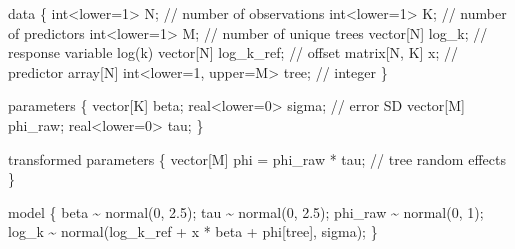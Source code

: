 \documentclass[
  12pt,
  letterpaper,
  DIV=11,
  numbers=noendperiod]{scrartcl}
\newenvironment{Shaded}{\begin{snugshade}}{\end{snugshade}}
\newcommand{\CommentTok}[1]{\textcolor[rgb]{0.37,0.37,0.37}{#1}}
\newcommand{\DataTypeTok}[1]{\textcolor[rgb]{0.68,0.00,0.00}{#1}}
\newcommand{\DecValTok}[1]{\textcolor[rgb]{0.68,0.00,0.00}{#1}}
\newcommand{\FloatTok}[1]{\textcolor[rgb]{0.68,0.00,0.00}{#1}}
\newcommand{\KeywordTok}[1]{\textcolor[rgb]{0.00,0.23,0.31}{#1}}
\newcommand{\NormalTok}[1]{\textcolor[rgb]{0.00,0.23,0.31}{#1}}
\begin{document}
\begin{Shaded}
\begin{Highlighting}[]
\KeywordTok{data}\NormalTok{ \{}
  \DataTypeTok{int}\NormalTok{\textless{}}\KeywordTok{lower}\NormalTok{=}\DecValTok{1}\NormalTok{\textgreater{} N;  }\CommentTok{// number of observations}
  \DataTypeTok{int}\NormalTok{\textless{}}\KeywordTok{lower}\NormalTok{=}\DecValTok{1}\NormalTok{\textgreater{} K; }\CommentTok{// number of predictors}
  \DataTypeTok{int}\NormalTok{\textless{}}\KeywordTok{lower}\NormalTok{=}\DecValTok{1}\NormalTok{\textgreater{} M;  }\CommentTok{// number of unique trees}
  \DataTypeTok{vector}\NormalTok{[N] log\_k;  }\CommentTok{// response variable log(k)}
  \DataTypeTok{vector}\NormalTok{[N] log\_k\_ref;  }\CommentTok{// offset}
  \DataTypeTok{matrix}\NormalTok{[N, K] x;  }\CommentTok{// predictor}
  \DataTypeTok{array}\NormalTok{[N] }\DataTypeTok{int}\NormalTok{\textless{}}\KeywordTok{lower}\NormalTok{=}\DecValTok{1}\NormalTok{, }\KeywordTok{upper}\NormalTok{=M\textgreater{} tree; }\CommentTok{// integer}
\NormalTok{\}}

\KeywordTok{parameters}\NormalTok{ \{}
  \DataTypeTok{vector}\NormalTok{[K] beta;}
  \DataTypeTok{real}\NormalTok{\textless{}}\KeywordTok{lower}\NormalTok{=}\DecValTok{0}\NormalTok{\textgreater{} sigma;  }\CommentTok{// error SD}
  \DataTypeTok{vector}\NormalTok{[M] phi\_raw;}
  \DataTypeTok{real}\NormalTok{\textless{}}\KeywordTok{lower}\NormalTok{=}\DecValTok{0}\NormalTok{\textgreater{} tau;}
\NormalTok{\}}

\KeywordTok{transformed parameters}\NormalTok{ \{}
  \DataTypeTok{vector}\NormalTok{[M] phi = phi\_raw * tau;  }\CommentTok{// tree random effects}
\NormalTok{\}}

\KeywordTok{model}\NormalTok{ \{}
\NormalTok{  beta \textasciitilde{} normal(}\DecValTok{0}\NormalTok{, }\FloatTok{2.5}\NormalTok{);}
\NormalTok{  tau \textasciitilde{} normal(}\DecValTok{0}\NormalTok{, }\FloatTok{2.5}\NormalTok{);}
\NormalTok{  phi\_raw \textasciitilde{} normal(}\DecValTok{0}\NormalTok{, }\DecValTok{1}\NormalTok{);}
\NormalTok{  log\_k \textasciitilde{} normal(log\_k\_ref + x * beta + phi[tree], sigma);}
\NormalTok{\}}
\end{Highlighting}
\end{Shaded}
\end{document}
